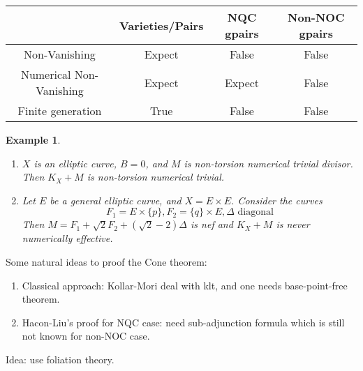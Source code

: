 \documentclass{article}
\newtheorem{example}[definition]{Example}
\begin{document}
\begin{table}[!h]
  \centering
  \begin{tabular}{|c|c|c|c|}
  \hline
  & Varieties/Pairs & NQC gpairs & Non-NOC gpairs  \\
  \hline
  Non-Vanishing & Expect & False & False \\
  \hline
  Numerical Non-Vanishing& Expect & Expect & False \\
  \hline
  Finite generation & True & False & False \\
  \hline
  \end{tabular}
\end{table}
\begin{example}
  \begin{enumerate}
    \item $X$ is an elliptic curve, $ B=0 $, and $M$ is non-torsion numerical trivial divisor. Then $ K_{X}+M $ is non-torsion numerical trivial.
    \item Let $E$ be a general elliptic curve, and $X=E \times E$. Consider the curves
      \[
        F_{1}=E \times \{p\}, F_{2}=\{q\} \times E, \Delta \text{ diagonal}
      \]
      Then $M= F_{1}+ \sqrt{2}F_{2} +(\sqrt{2}-2)\Delta $ is nef and $ K_{X}+M $ is never numerically effective. 
  \end{enumerate}
\end{example}
Some natural ideas to proof the Cone theorem:
\begin{enumerate}
  \item Classical approach: Kollar-Mori deal with klt, and one needs base-point-free theorem.
  \item Hacon-Liu's proof for NQC case: need sub-adjunction formula which is still not known for non-NOC case.
\end{enumerate}
Idea: use foliation theory. 
\end{document}

